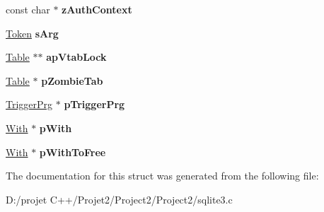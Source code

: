 \begin{DoxyCompactItemize}
\mbox{\label{struct_parse_a12c6e2fb69848bcc57169d44993c351f}} 
const char $\ast$ {\bfseries z\+Auth\+Context}
\item 
\mbox{\label{struct_parse_aa3fe38b31dd1cd0fbea4de0e77891642}} 
\mbox{\hyperlink{struct_token}{Token}} {\bfseries s\+Arg}
\item 
\mbox{\label{struct_parse_acdfd318c0f04ec640d6affc85ef8a009}} 
\mbox{\hyperlink{struct_table}{Table}} $\ast$$\ast$ {\bfseries ap\+Vtab\+Lock}
\item 
\mbox{\label{struct_parse_a4e8319f0a7f0d21e472c13ac6cf67060}} 
\mbox{\hyperlink{struct_table}{Table}} $\ast$ {\bfseries p\+Zombie\+Tab}
\item 
\mbox{\label{struct_parse_a0891dbd3b583594c5d07d7b061026ea4}} 
\mbox{\hyperlink{struct_trigger_prg}{Trigger\+Prg}} $\ast$ {\bfseries p\+Trigger\+Prg}
\item 
\mbox{\label{struct_parse_a7a812b036ddcc4b838b956328e1ff03e}} 
\mbox{\hyperlink{struct_with}{With}} $\ast$ {\bfseries p\+With}
\item 
\mbox{\label{struct_parse_ae8e4463fa9d87da2833a542e27dd722d}} 
\mbox{\hyperlink{struct_with}{With}} $\ast$ {\bfseries p\+With\+To\+Free}
\end{DoxyCompactItemize}


The documentation for this struct was generated from the following file\+:\begin{DoxyCompactItemize}
\item 
D\+:/projet C++/\+Projet2/\+Project2/\+Project2/sqlite3.\+c\end{DoxyCompactItemize}
